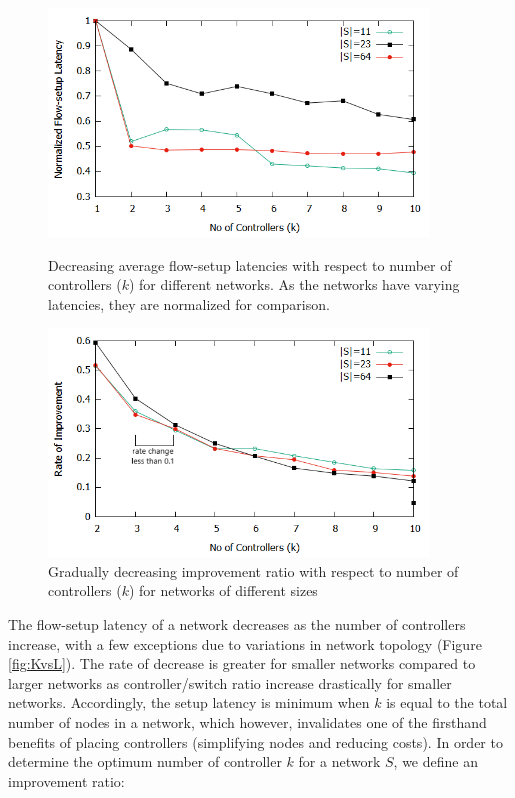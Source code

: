 \documentclass[preprint,12pt]{elsarticle}
\begin{document}
	\begin{figure}
		\centering
		\includegraphics[width=0.9\textwidth]{Images/k_vs_l.png}
		\caption{Decreasing average flow-setup latencies with respect to number of controllers ($k$) for different networks. As the networks have varying latencies, they are normalized for comparison.} \label{fig:KvsL}
		\vspace{1cm}
		\centering
		\includegraphics[width=0.9\textwidth]{Images/cutoff.png}
		\caption{Gradually decreasing improvement ratio with respect to number of controllers ($k$) for networks of different sizes} \label{fig:cutoff}
	\end{figure}

	The flow-setup latency of a network decreases as the number of controllers increase, with a few exceptions due to variations in network topology (Figure \ref{fig:KvsL}). The rate of decrease is greater for smaller networks compared to larger networks as controller/switch ratio increase drastically for smaller networks. Accordingly, the setup latency is minimum when $k$ is equal to the total number of nodes in a network, which however, invalidates one of the firsthand benefits of placing controllers (simplifying nodes and reducing costs). In order to determine the optimum number of controller $k$ for a network $S$, we define an improvement ratio:
	
\end{document}
